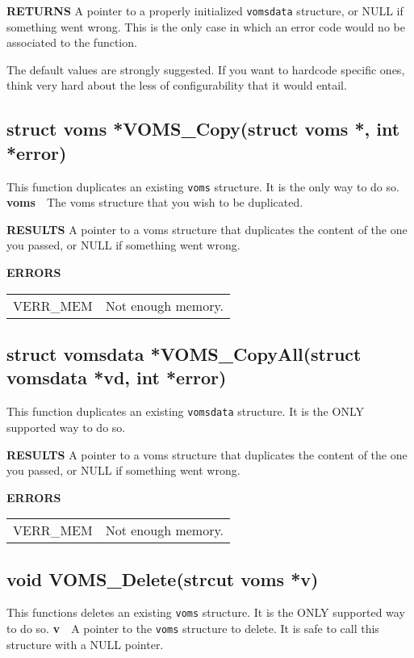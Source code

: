 \documentclass[a4paper]{book}
\newcommand{\errors}{\noindent \textbf{ERRORS}\newline}
\newcommand{\result}{\noindent \textbf{RESULTS}\newline}
\newcommand{\return}{\noindent \textbf{RETURNS}\newline}
\newcommand{\parameter}[1]{\newline\textbf{#1}\ \ }
\begin{document}
\return
A pointer to a properly initialized \verb|vomsdata| structure, or NULL
if something went wrong.  This is the only case in which an error code
would no be associated to the function.

The default values are strongly suggested.  If you want to hardcode
specific ones, think very hard about the less of configurability that
it would entail.

\subsection{struct voms *VOMS\_Copy(struct voms *, int *error)}

This function duplicates an existing \verb|voms| structure.  It is the
only way to do so.
\parameter{voms}{The voms structure that you wish to be duplicated.}

\result
A pointer to a voms structure that duplicates the content of the one
you passed, or NULL if something went wrong.

\errors
\bigskip\begin{tabular}{lp{3in}}
VERR\_MEM & Not enough memory.\\
\end{tabular}

\subsection{struct vomsdata *VOMS\_CopyAll(struct vomsdata *vd, int
  *error)}

This function duplicates an existing \verb|vomsdata| structure.  It is
the ONLY supported way to do so.

\result
A pointer to a voms structure that duplicates the content of the one
you passed, or NULL if something went wrong.

\errors
\bigskip\begin{tabular}{lp{3in}}
VERR\_MEM & Not enough memory.\\
\end{tabular}

\subsection{void VOMS\_Delete(strcut voms *v)}

This functions deletes an existing \verb|voms| structure.  It is the
ONLY supported way to do so.
\parameter{v}{A pointer to the \verb|voms| structure to delete. It is
  safe to call this structure with a NULL pointer.}
\end{document}
